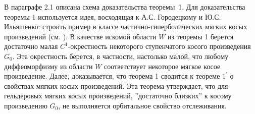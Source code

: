 \documentclass[12pt]{article}
\begin{document}
{%



В параграфе 2.1 описана схема доказательства теоремы~1. Для доказательства теоремы 1 используется идея, восходящая к А.С. Го\-ро\-дец\-кому и Ю.С. Ильяшенко: строить пример в клас\-се час\-тич\-но-ги\-пер\-болических мягких косых произведений (см. \cite{17}). %
В качестве искомой области $W$ из теоремы 1 берется достаточно малая $C^1$-окрестность некоторого ступенчатого косого произведения $G_0$. Эта окрестность берется, в частности, настолько малой, что любому диффеоморфизму из области $W$ соответствует некоторое мягкое косое произведение. Далее, доказывается, что теорема 1 сводится к теореме $1^{\prime}$ о свойствах мягких косых произведений. Эта теорема утверждает, что для гельдеровых мягких косых произве\-де\-ний, ''дос\-та\-точ\-но близких'' к косому произведению $G_0$, не выполняется орбитальное свойство отслеживания.

}
\end{document}
